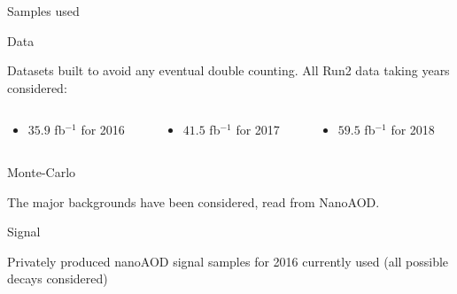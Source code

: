 \documentclass[9pt]{beamer}
\begin{document}
\begin{frame}{Samples used}
\justifying
\begin{block}{\centering Data}\end{block}
 Datasets built to avoid any eventual double counting. All Run2 data taking years considered:

\begin{columns}
\hspace{15pt}
	\begin{column}{0.32\textwidth}
		\begin{itemize}
		\item $35.9$ fb$^{-1}$ for 2016
		\end{itemize}
	\end{column} \hfill
	\begin{column}{0.32\textwidth}
		\begin{itemize}
		\item $41.5$ fb$^{-1}$ for 2017
		\end{itemize}
	\end{column} \hfill
	\begin{column}{0.32\textwidth}
		\begin{itemize}
		\item $59.5$ fb$^{-1}$ for 2018
		\end{itemize}
	\end{column} \hfill
\end{columns} \vfill
\vspace{10pt}
\begin{block}{\centering Monte-Carlo}\end{block}
The major backgrounds have been considered, read from NanoAOD. \vfill
{} \vfill
\vspace{8pt}
\begin{block}{\centering Signal}\end{block}
Privately produced nanoAOD signal samples for 2016 currently used (all possible decays considered) \vfill
\end{frame}
\end{document}
